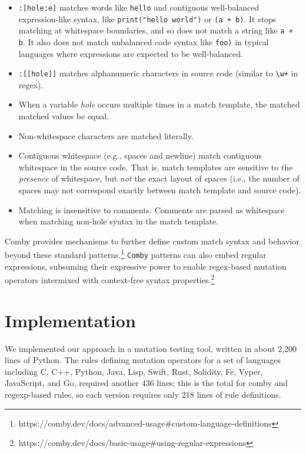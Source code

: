 \documentclass[sigconf,review, anonymous]{acmart}
\begin{document}
{\begin{itemize}
\item \texttt{\small:[hole:e]} matches words like \texttt{\small hello} and contiguous well-balanced expression-like syntax, like \texttt{\small print("hello world")} or \texttt{\small (a + b)}. It stops matching at whitespace boundaries, and so does not match a string like \texttt{\small a + b}. It also does not match unbalanced code syntax like \texttt{\small foo)} in typical languages where expressions are expected to be well-balanced.

\item \texttt{\small :[[hole]]} matches alphanumeric characters in source code (similar to \texttt{\small\textbackslash w+} in regex).

\item When a variable \emph{hole} occurs multiple times in a match template, the matched matched values be equal.

\item Non-whitespace characters are matched literally.

\item Contiguous whitespace (e.g., spaces and newline) match contiguous whitespace in the source code. That is, match templates are sensitive to the \emph{presence} of whitespace, but \emph{not} the exact layout of spaces (i.e., the number of spaces may not correspond exactly between match template and source code).

\item Matching is insensitive to comments. Comments are parsed as whitespace when matching non-hole syntax in the match template.

\end{itemize}

Comby provides mechanisms to further define custom match syntax and behavior
beyond these standard patterns.\footnote{https://comby.dev/docs/advanced-usage\#custom-language-definitions} \texttt{Comby} patterns can also embed regular expressions, subsuming their
expressive power to enable regex-based mutation operators intermixed with
context-free syntax properties.\footnote{https://comby.dev/docs/basic-usage\#using-regular-expressions}

\section{Implementation}

We implemented our approach in a mutation testing tool, written in
about 2,200 lines of Python.  The rules defining mutation operators
for a set of languages including C, C++, Python, Java, Lisp, Swift,
Rust, Solidity, Fe, Vyper, JavaScript, and Go, required another 436
lines; this is the total for comby and regexp-based rules, so each
version requires only 218 lines of rule definitions.

}
\end{document}
